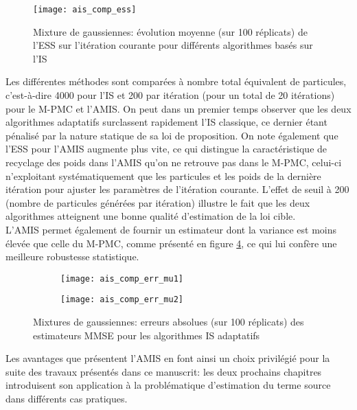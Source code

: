 \begin{figure}[h!]
	\centering
	\texttt{[image: ais\_comp\_ess]}
	\caption{Mixture de gaussiennes: évolution moyenne (sur 100 réplicats) de l'ESS sur l'itération courante pour différents algorithmes basés sur l'IS}
	\label{fig_ais_comp_ess}
\end{figure}

Les différentes méthodes sont comparées à nombre total équivalent de particules, c'est-à-dire 4000 pour l'IS et 200 par itération (pour un total de 20 itérations) pour le M-PMC et l'AMIS. On peut dans un premier temps observer que les deux algorithmes adaptatifs surclassent rapidement l'IS classique, ce dernier étant pénalisé par la nature statique de sa loi de proposition. On note également que l'ESS pour l'AMIS augmente plus vite, ce qui distingue la caractéristique de recyclage des poids dans l'AMIS qu'on ne retrouve pas dans le M-PMC, celui-ci n'exploitant systématiquement que les particules et les poids de la dernière itération pour ajuster les paramètres de l'itération courante. L'effet de seuil à 200 (nombre de particules générées par itération) illustre le fait que les deux algorithmes atteignent une bonne qualité d'estimation de la loi cible.\\

L'AMIS permet également de fournir un estimateur dont la variance est moins élevée que celle du M-PMC, comme présenté en figure \ref{fig_ais_comp_err}, ce qui lui confère une meilleure robustesse statistique. 

\begin{figure}[h!]
	\centering
	\begin{subfigure}[t]{0.5\textwidth}
		\centering
		\texttt{[image: ais\_comp\_err\_mu1]}
		\caption{}
		\label{ais_comp_mu1}
	\end{subfigure}%
	\begin{subfigure}[t]{0.5\textwidth}
		\centering
		\texttt{[image: ais\_comp\_err\_mu2]}
		\caption{}
		\label{ais_comp_mu2}
	\end{subfigure}
	\caption{Mixtures de gaussiennes: erreurs absolues (sur 100 réplicats) des estimateurs MMSE pour les algorithmes IS adaptatifs} 
	\label{fig_ais_comp_err}
\end{figure}


Les avantages que présentent l'AMIS en font ainsi un choix privilégié pour la suite des travaux présentés dans ce manuscrit: les deux prochains chapitres introduisent son application à la problématique d'estimation du terme source dans différents cas pratiques.
